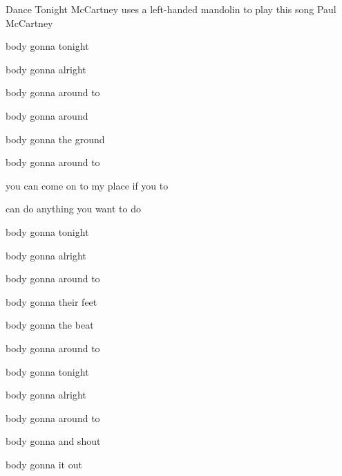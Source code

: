 \begin{SBSong}{Dance Tonight}
  {McCartney uses a left-handed mandolin to play this song}
  {Paul McCartney}
  \begin{SBVerse}
    body gonna  tonight

    body gonna  alright

    body gonna  around to

    body gonna  around
    
    body gonna  the ground
    
    body gonna  around to
  \end{SBVerse}
  \begin{SBChorus}
     you can come on to my place if you  to
    
     can do anything you want to do 
  \end{SBChorus}
  \begin{SBVerse}
    body gonna  tonight

    body gonna  alright

    body gonna  around to

    body gonna  their feet

    body gonna  the beat
  
    body gonna  around to
  \end{SBVerse}
  \begin{SBVerse}
    body gonna  tonight

    body gonna  alright

    body gonna  around to

    body gonna  and shout

    body gonna  it out
  

\end{SBVerse}
\end{SBSong}
